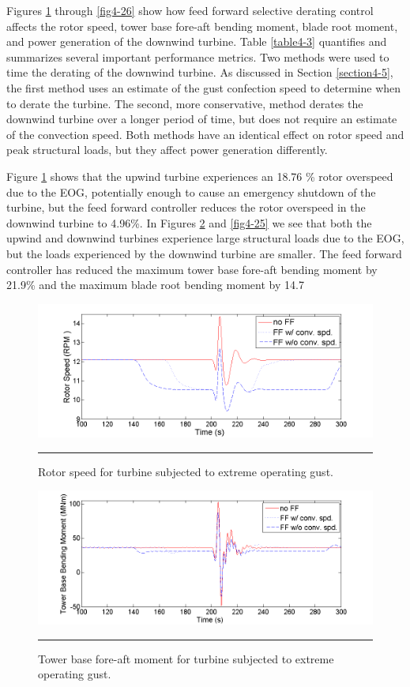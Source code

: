 Figures \ref{fig4-23} through \ref{fig4-26} show how feed forward selective derating control affects the rotor speed, tower base fore-aft bending moment, blade root moment, and power generation of the downwind turbine. Table \ref{table4-3} quantifies and summarizes several important performance metrics. Two methods were used to time the derating of the downwind turbine. As discussed in Section \ref{section4-5}, the first method uses an estimate of the gust confection speed to determine when to derate the turbine. The second, more conservative,  method derates the downwind turbine over a longer period of time, but does not require an estimate of the convection speed. Both methods have an identical effect on rotor speed and peak structural loads, but they affect power generation differently. 

Figure \ref{fig4-23} shows that the upwind turbine experiences an 18.76 \% rotor overspeed due to the EOG, potentially enough to cause an emergency shutdown of the turbine, but the feed forward controller reduces the rotor overspeed in the downwind turbine to 4.96\%. In Figures \ref{fig4-24} and \ref{fig4-25} we see that both the upwind and downwind turbines experience large structural loads due to the EOG, but the loads experienced by the downwind turbine are smaller. The feed forward controller has reduced the maximum tower base fore-aft bending moment by 21.9\% and the maximum blade root bending moment by 14.7%

\begin{figure}[htbp]
	\centering
		\includegraphics[trim = {1cm 0 2cm 0}, clip, width = \linewidth]{Figures/ch4Figures/fig4-23.png}
		\rule{35em}{0.5pt}
	\caption{Rotor speed for turbine subjected to extreme operating gust.}
	\label{fig4-23}
\end{figure}

\begin{figure}[htbp]
	\centering
		\includegraphics[trim = {1cm 0 2cm 0}, clip, width = \linewidth]{Figures/ch4Figures/fig4-24.png}
		\rule{35em}{0.5pt}
	\caption{Tower base fore-aft moment for turbine subjected to extreme operating gust.}
	\label{fig4-24}
\end{figure}

